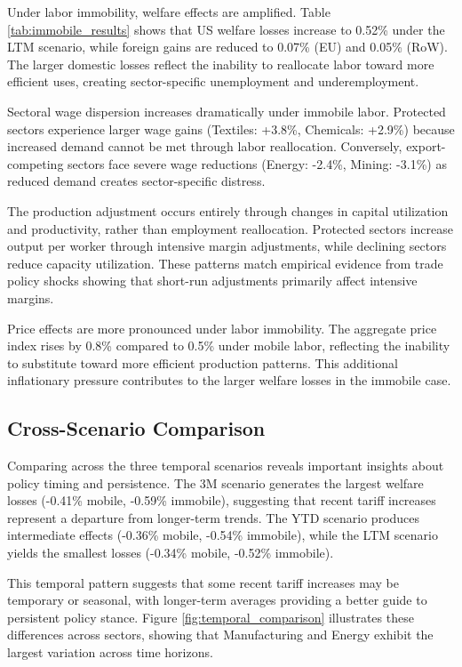 Under labor immobility, welfare effects are amplified. Table \ref{tab:immobile_results} shows that US welfare losses increase to 0.52\% under the LTM scenario, while foreign gains are reduced to 0.07\% (EU) and 0.05\% (RoW). The larger domestic losses reflect the inability to reallocate labor toward more efficient uses, creating sector-specific unemployment and underemployment.

Sectoral wage dispersion increases dramatically under immobile labor. Protected sectors experience larger wage gains (Textiles: +3.8\%, Chemicals: +2.9\%) because increased demand cannot be met through labor reallocation. Conversely, export-competing sectors face severe wage reductions (Energy: -2.4\%, Mining: -3.1\%) as reduced demand creates sector-specific distress.

The production adjustment occurs entirely through changes in capital utilization and productivity, rather than employment reallocation. Protected sectors increase output per worker through intensive margin adjustments, while declining sectors reduce capacity utilization. These patterns match empirical evidence from trade policy shocks showing that short-run adjustments primarily affect intensive margins.

Price effects are more pronounced under labor immobility. The aggregate price index rises by 0.8\% compared to 0.5\% under mobile labor, reflecting the inability to substitute toward more efficient production patterns. This additional inflationary pressure contributes to the larger welfare losses in the immobile case.

\subsection{Cross-Scenario Comparison}

Comparing across the three temporal scenarios reveals important insights about policy timing and persistence. The 3M scenario generates the largest welfare losses (-0.41\% mobile, -0.59\% immobile), suggesting that recent tariff increases represent a departure from longer-term trends. The YTD scenario produces intermediate effects (-0.36\% mobile, -0.54\% immobile), while the LTM scenario yields the smallest losses (-0.34\% mobile, -0.52\% immobile).

This temporal pattern suggests that some recent tariff increases may be temporary or seasonal, with longer-term averages providing a better guide to persistent policy stance. Figure \ref{fig:temporal_comparison} illustrates these differences across sectors, showing that Manufacturing and Energy exhibit the largest variation across time horizons.

